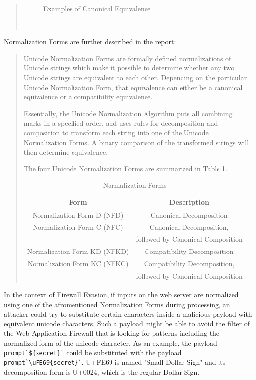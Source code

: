 \begin{quote}
\begin{figure}[h]
		\label{fig:compeq}
		\caption{ Examples of Canonical Equivalence \cite{unicode/normalization}}
	\end{figure}
	\\
\end{quote}

Normalization Forms are further described in the report:
\begin{quote}
	Unicode Normalization Forms are formally defined normalizations of Unicode strings which make it possible to determine whether any two Unicode strings are equivalent to each other. Depending on the particular Unicode Normalization Form, that equivalence can either be a canonical equivalence or a compatibility equivalence.

	Essentially, the Unicode Normalization Algorithm puts all combining marks in a specified order, and uses rules for decomposition and composition to transform each string into one of the Unicode Normalization Forms. A binary comparison of the transformed strings will then determine equivalence.

	The four Unicode Normalization Forms are summarized in Table 1. \cite{unicode/normalization}
	\begin{table}[h]
		\centering
		\label{tab:normform}
		\caption{ Normalization Forms }
		\begin{tabular}{ |c|c| }
			\hline
			Form                         & Description                       \\
			\hline
			\hline
			Normalization Form D (NFD)   & Canonical Decomposition           \\
			\hline
			Normalization Form C (NFC)   & Canonical Decomposition,          \\
			                             & followed by Canonical Composition \\
			\hline
			Normalization Form KD (NFKD) & Compatibility Decomposition       \\
			Normalization Form KC (NFKC) & Compatibility Decomposition,      \\
			                             & followed by Canonical Composition \\
			\hline
		\end{tabular}
	\end{table}
\end{quote}
In the context of Firewall Evasion, if inputs on the web server are normalized using one of the afromentioned Normalization Forms during processing, an attacker could try to substitute certain characters inside a malicious payload with equivalent unicode characters. \cite{medium/allypetitt} Such a payload might be able to avoid the filter of the Web Application Firewall that is looking for patterns including the normalized form of the unicode character. As an example, the payload \verb|prompt`${secret}`| could be substituted with the payload \verb|prompt`\uFE69{secret}`|. U+FE69 is named "Small Dollar Sign" and its decomposition form is U+0024, which is the regular Dollar Sign. \cite{comp/uni}
